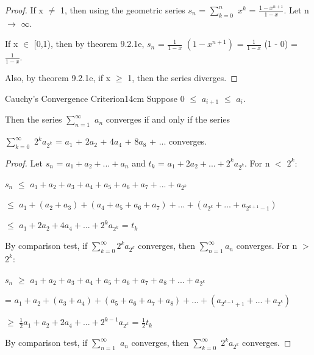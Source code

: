     \begin{proof}
        If x $\not =$ 1, then using the geometric series
        $s_n$ = $\sum_{k=0}^n$ $x^k$ = $\frac{1 - x^{n+1}}{1 - x}$.
        Let n $\rightarrow$ $\infty$.

        If x $\in$ [0,1), then by {\color{red} theorem 9.2.1e},
        $s_n$ = $\frac{1}{1-x}$ $(1 - x^{n+1})$
        = $\frac{1}{1-x}$ (1 - 0) = $\frac{1}{1-x}$.

        Also, by {\color{red} theorem 9.2.1e}, if x $\geq$ 1,
        then the series diverges.        
    \end{proof}

    \vspace{0.5cm}



    \begin{wtheorem}{Cauchy's Convergence Criterion}{14cm}
        Suppose 0 $\leq$ $a_{i+1}$ $\leq$ $a_{i}$.

        Then the series $\sum_{n=1}^{\infty}$ $a_n$ converges
        if and only if the series

        \hspace{1cm}
        $\sum_{k=0}^{\infty}$ $2^k a_{2^k}$
        = $a_1$ + $2a_2$ + $4a_4$ + $8a_8$ + ...
        converges.
    \end{wtheorem}
    
    \begin{proof}
        Let $s_n$ = $a_1 + a_2 + ... + a_n$ and
        $t_k$ = $a_1 + 2a_2 + ... + 2^ka_{2^k}$.
        For n $<$ $2^k$:

        \hspace{1cm}
        $s_n$
        $\leq$ $a_1 + a_2 + a_3 + a_4 + a_5 + a_6 + a_7 + ... + a_{2^k}$

        \hspace{1.55cm}
        $\leq$ $a_1 + (a_2 + a_3) + (a_4 + a_5 + a_6 + a_7)
                    + ... + (a_{2^k} + ... + a_{2^{k+1} - 1})$

        \hspace{1.55cm}
        $\leq$ $a_1 + 2a_2 + 4a_4 + ... + 2^ka_{2^k}$
        = $t_k$

        By {\color{red} comparison test},
        if $\sum_{k=0}^{\infty} 2^k a_{2^k}$ converges, then
        $\sum_{n=1}^{\infty} a_n$ converges.
        For n $>$ $2^k$:

        \hspace{1cm}
        $s_n$
        $\geq$ $a_1 + a_2 + a_3 + a_4 + a_5 + a_6 + a_7 + a_8 + ... + a_{2^k}$

        \hspace{1.55cm}
        = $a_1 + a_2 + (a_3 + a_4) + (a_5 + a_6 + a_7 + a_8)
                    + ... + (a_{2^{k-1} + 1} + ... + a_{2^k})$

        \hspace{1.55cm}
        $\geq$ $\frac{1}{2}a_1 + a_2 + 2a_4 + ... + 2^{k-1}a_{2^k}$
        = $\frac{1}{2}t_k$

        By {\color{red} comparison test},
        if $\sum_{n=1}^{\infty}$ $a_n$ converges, then
        $\sum_{k=0}^{\infty}$ $2^k a_{2^k}$ converges.
    \end{proof}

